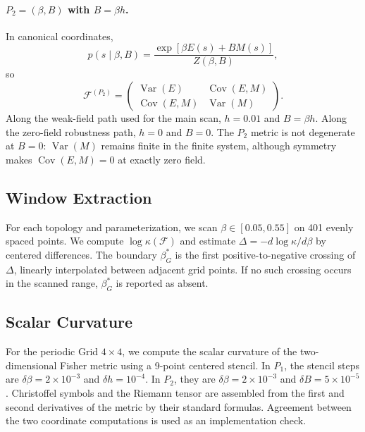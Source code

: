 \documentclass[11pt,a4paper]{article}
\begin{document}
\paragraph{$P_2=(\beta,B)$ with $B=\beta h$.}
In canonical coordinates,
\begin{equation}
p(s\mid\beta,B)=\frac{\exp[\beta E(s)+B M(s)]}{Z(\beta,B)},
\end{equation}
so
\begin{equation}
\mathcal F^{(P_2)}
=\begin{pmatrix}
\operatorname{Var}(E) & \operatorname{Cov}(E,M)\\
\operatorname{Cov}(E,M) & \operatorname{Var}(M)
\end{pmatrix}.
\end{equation}
Along the weak-field path used for the main scan, $h=0.01$ and $B=\beta h$.  Along the zero-field robustness path, $h=0$ and $B=0$.  The $P_2$ metric is not degenerate at $B=0$: $\operatorname{Var}(M)$ remains finite in the finite system, although symmetry makes $\operatorname{Cov}(E,M)=0$ at exactly zero field.

\subsection{Window Extraction}

For each topology and parameterization, we scan $\beta\in[0.05,0.55]$ on 401 evenly spaced points.  We compute $\log\kappa(\mathcal F)$ and estimate $\Delta=-d\log\kappa/d\beta$ by centered differences.  The boundary $\beta_G^*$ is the first positive-to-negative crossing of $\Delta$, linearly interpolated between adjacent grid points.  If no such crossing occurs in the scanned range, $\beta_G^*$ is reported as absent.

\subsection{Scalar Curvature}

For the periodic Grid $4\times4$, we compute the scalar curvature of the two-dimensional Fisher metric using a 9-point centered stencil.  In $P_1$, the stencil steps are $\delta\beta=2\times10^{-3}$ and $\delta h=10^{-4}$.  In $P_2$, they are $\delta\beta=2\times10^{-3}$ and $\delta B=5\times10^{-5}$.  Christoffel symbols and the Riemann tensor are assembled from the first and second derivatives of the metric by their standard formulas.  Agreement between the two coordinate computations is used as an implementation check.
\end{document}
